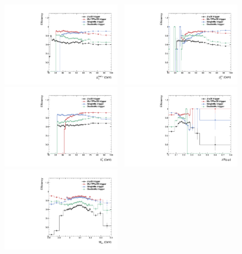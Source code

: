 		\begin{figure}[p]
		  \centering
		    \includegraphics[width=0.45\textwidth]{Fig/Trigger/Eff_Mu1Pt_HJpsiG_Comp}~
		    \includegraphics[width=0.45\textwidth]{Fig/Trigger/Eff_ptmumu_HJpsiG_Comp}\\
		    \includegraphics[width=0.45\textwidth]{Fig/Trigger/Eff_EtPho_HJpsiG_Comp}~
		    \includegraphics[width=0.45\textwidth]{Fig/Trigger/Eff_dR_HJpsiG_Comp}\\
		    \includegraphics[width=0.45\textwidth]{Fig/Trigger/Eff_Mmumu_HJpsiG_Comp}~

\end{figure}
